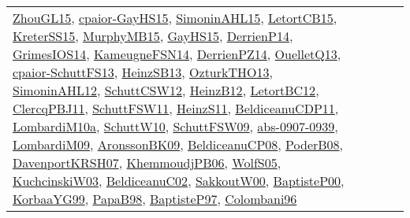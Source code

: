 {\begin{longtable}{lp{3cm}>{\raggedright}p{6cm}>{\raggedright}p{6cm}p{8cm}}
\href{papers/ZhouGL15.pdf}{ZhouGL15}\cite{ZhouGL15}, \href{papers/cpaior-GayHS15.pdf}{cpaior-GayHS15}\cite{cpaior-GayHS15}, \href{articles/SimoninAHL15.pdf}{SimoninAHL15}\cite{SimoninAHL15}, \href{articles/LetortCB15.pdf}{LetortCB15}\cite{LetortCB15}, \href{papers/KreterSS15.pdf}{KreterSS15}\cite{KreterSS15}, \href{papers/MurphyMB15.pdf}{MurphyMB15}\cite{MurphyMB15}, \href{papers/GayHS15.pdf}{GayHS15}\cite{GayHS15}, \href{papers/DerrienP14.pdf}{DerrienP14}\cite{DerrienP14}, \href{articles/GrimesIOS14.pdf}{GrimesIOS14}\cite{GrimesIOS14}, \href{articles/KameugneFSN14.pdf}{KameugneFSN14}\cite{KameugneFSN14}, \href{papers/DerrienPZ14.pdf}{DerrienPZ14}\cite{DerrienPZ14}, \href{papers/OuelletQ13.pdf}{OuelletQ13}\cite{OuelletQ13}, \href{papers/cpaior-SchuttFS13.pdf}{cpaior-SchuttFS13}\cite{cpaior-SchuttFS13}, \href{articles/HeinzSB13.pdf}{HeinzSB13}\cite{HeinzSB13}, \href{articles/OzturkTHO13.pdf}{OzturkTHO13}\cite{OzturkTHO13}, \href{papers/SimoninAHL12.pdf}{SimoninAHL12}\cite{SimoninAHL12}, \href{papers/SchuttCSW12.pdf}{SchuttCSW12}\cite{SchuttCSW12}, \href{papers/HeinzB12.pdf}{HeinzB12}\cite{HeinzB12}, \href{papers/LetortBC12.pdf}{LetortBC12}\cite{LetortBC12}, \href{papers/ClercqPBJ11.pdf}{ClercqPBJ11}\cite{ClercqPBJ11}, \href{articles/SchuttFSW11.pdf}{SchuttFSW11}\cite{SchuttFSW11}, \href{papers/HeinzS11.pdf}{HeinzS11}\cite{HeinzS11}, \href{articles/BeldiceanuCDP11.pdf}{BeldiceanuCDP11}\cite{BeldiceanuCDP11}, \href{articles/LombardiM10a.pdf}{LombardiM10a}\cite{LombardiM10a}, \href{papers/SchuttW10.pdf}{SchuttW10}\cite{SchuttW10}, \href{papers/SchuttFSW09.pdf}{SchuttFSW09}\cite{SchuttFSW09}, \href{articles/abs-0907-0939.pdf}{abs-0907-0939}\cite{abs-0907-0939}, \href{papers/LombardiM09.pdf}{LombardiM09}\cite{LombardiM09}, \href{papers/AronssonBK09.pdf}{AronssonBK09}\cite{AronssonBK09}, \href{papers/BeldiceanuCP08.pdf}{BeldiceanuCP08}\cite{BeldiceanuCP08}, \href{papers/PoderB08.pdf}{PoderB08}\cite{PoderB08}, \href{papers/DavenportKRSH07.pdf}{DavenportKRSH07}\cite{DavenportKRSH07}, \href{papers/KhemmoudjPB06.pdf}{KhemmoudjPB06}\cite{KhemmoudjPB06}, \href{papers/WolfS05.pdf}{WolfS05}\cite{WolfS05}, \href{articles/KuchcinskiW03.pdf}{KuchcinskiW03}\cite{KuchcinskiW03}, \href{papers/BeldiceanuC02.pdf}{BeldiceanuC02}\cite{BeldiceanuC02}, \href{articles/SakkoutW00.pdf}{SakkoutW00}\cite{SakkoutW00}, \href{articles/BaptisteP00.pdf}{BaptisteP00}\cite{BaptisteP00}, \href{papers/KorbaaYG99.pdf}{KorbaaYG99}\cite{KorbaaYG99}, \href{articles/PapaB98.pdf}{PapaB98}\cite{PapaB98}, \href{papers/BaptisteP97.pdf}{BaptisteP97}\cite{BaptisteP97}, \href{papers/Colombani96.pdf}{Colombani96}\cite{Colombani96}\\

\end{longtable}}
